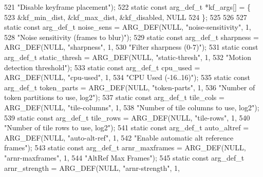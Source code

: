 \begin{DoxyCodeInclude}
{{{{{{{{{521                                              \textcolor{stringliteral}{"Disable keyframe placement"});
522 \textcolor{keyword}{static} \textcolor{keyword}{const} arg\_def\_t *kf\_args[] = \{
523   &kf\_min\_dist, &kf\_max\_dist, &kf\_disabled, NULL
524 \};
525 
526 
527 \textcolor{keyword}{static} \textcolor{keyword}{const} arg\_def\_t noise\_sens = ARG\_DEF(NULL, \textcolor{stringliteral}{"noise-sensitivity"}, 1,
528                                             \textcolor{stringliteral}{"Noise sensitivity (frames to blur)"});
529 \textcolor{keyword}{static} \textcolor{keyword}{const} arg\_def\_t sharpness = ARG\_DEF(NULL, \textcolor{stringliteral}{"sharpness"}, 1,
530                                            \textcolor{stringliteral}{"Filter sharpness (0-7)"});
531 \textcolor{keyword}{static} \textcolor{keyword}{const} arg\_def\_t static\_thresh = ARG\_DEF(NULL, \textcolor{stringliteral}{"static-thresh"}, 1,
532                                                \textcolor{stringliteral}{"Motion detection threshold"});
533 \textcolor{keyword}{static} \textcolor{keyword}{const} arg\_def\_t cpu\_used = ARG\_DEF(NULL, \textcolor{stringliteral}{"cpu-used"}, 1,
534                                           \textcolor{stringliteral}{"CPU Used (-16..16)"});
535 \textcolor{keyword}{static} \textcolor{keyword}{const} arg\_def\_t token\_parts = ARG\_DEF(NULL, \textcolor{stringliteral}{"token-parts"}, 1,
536                                      \textcolor{stringliteral}{"Number of token partitions to use, log2"});
537 \textcolor{keyword}{static} \textcolor{keyword}{const} arg\_def\_t tile\_cols = ARG\_DEF(NULL, \textcolor{stringliteral}{"tile-columns"}, 1,
538                                          \textcolor{stringliteral}{"Number of tile columns to use, log2"});
539 \textcolor{keyword}{static} \textcolor{keyword}{const} arg\_def\_t tile\_rows = ARG\_DEF(NULL, \textcolor{stringliteral}{"tile-rows"}, 1,
540                                            \textcolor{stringliteral}{"Number of tile rows to use, log2"});
541 \textcolor{keyword}{static} \textcolor{keyword}{const} arg\_def\_t auto\_altref = ARG\_DEF(NULL, \textcolor{stringliteral}{"auto-alt-ref"}, 1,
542                                              \textcolor{stringliteral}{"Enable automatic alt reference frames"});
543 \textcolor{keyword}{static} \textcolor{keyword}{const} arg\_def\_t arnr\_maxframes = ARG\_DEF(NULL, \textcolor{stringliteral}{"arnr-maxframes"}, 1,
544                                                 \textcolor{stringliteral}{"AltRef Max Frames"});
545 \textcolor{keyword}{static} \textcolor{keyword}{const} arg\_def\_t arnr\_strength = ARG\_DEF(NULL, \textcolor{stringliteral}{"arnr-strength"}, 1,
}}}}}}}}}
\end{DoxyCodeInclude}
